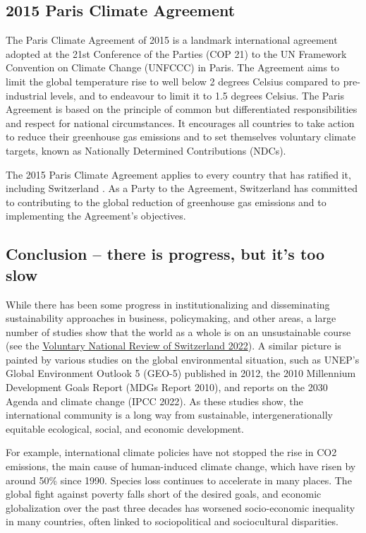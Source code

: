 \documentclass[
  a4paper,
  openany]{book}
\begin{document}
\subsection{2015 Paris Climate Agreement}\label{paris-climate-agreement}

The Paris Climate Agreement of 2015 is a landmark international
agreement adopted at the 21st Conference of the Parties (COP 21) to the
UN Framework Convention on Climate Change (UNFCCC) in Paris. The
Agreement aims to limit the global temperature rise to well below 2
degrees Celsius compared to pre-industrial levels, and to endeavour to
limit it to 1.5 degrees Celsius. The Paris Agreement is based on the
principle of common but differentiated responsibilities and respect for
national circumstances. It encourages all countries to take action to
reduce their greenhouse gas emissions and to set themselves voluntary
climate targets, known as Nationally Determined Contributions (NDCs).

The 2015 Paris Climate Agreement applies to every country that has
ratified it, including Switzerland . As a Party to the Agreement,
Switzerland has committed to contributing to the global reduction of
greenhouse gas emissions and to implementing the Agreement's objectives.

\subsection{Conclusion -- there is progress, but it's too
slow}\label{conclusion-there-is-progress-but-its-too-slow}

While there has been some progress in institutionalizing and
disseminating sustainability approaches in business, policymaking, and
other areas, a large number of studies show that the world as a whole is
on an unsustainable course (see the
\href{https://www.sdgital2030.ch/countryreport}{Voluntary National
Review of Switzerland 2022}). A similar picture is painted by various
studies on the global environmental situation, such as UNEP's Global
Environment Outlook 5 (GEO-5) published in 2012, the 2010 Millennium
Development Goals Report (MDGs Report 2010), and reports on the 2030
Agenda and climate change (IPCC 2022). As these studies show, the
international community is a long way from sustainable,
intergenerationally equitable ecological, social, and economic
development.

For example, international climate policies have not stopped the rise in
CO2 emissions, the main cause of human-induced climate change, which
have risen by around 50\% since 1990. Species loss continues to
accelerate in many places. The global fight against poverty falls short
of the desired goals, and economic globalization over the past three
decades has worsened socio-economic inequality in many countries, often
linked to sociopolitical and sociocultural disparities.
\end{document}
